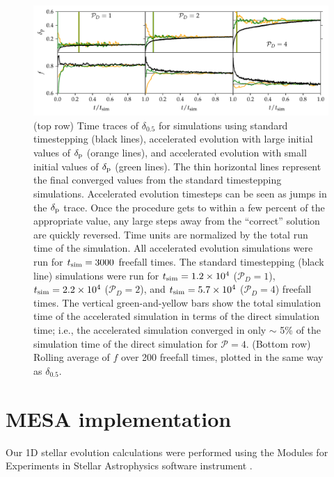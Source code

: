 \documentclass[twocolumn]{aastex631}
\newcommand{\delp}{\ensuremath{\delta_{\rm{p}}}}
\newcommand{\mP}{\ensuremath{\mathcal{P}}}
\begin{document}
\begin{figure}[t]
\centering
\includegraphics[width=\textwidth]{AE_time_figure.pdf}
\caption{
\label{fig:AE_time_figure}
(top row) Time traces of $\delta_{0.5}$ for simulations using standard timestepping (black lines), accelerated evolution with large initial values of $\delp$ (orange lines), and accelerated evolution with small initial values of $\delp$ (green lines).
The thin horizontal lines represent the final converged values from the standard timestepping simulations.
Accelerated evolution timesteps can be seen as jumps in the $\delp$ trace.
Once the procedure gets to within a few percent of the appropriate value, any large steps away from the ``correct'' solution are quickly reversed.
Time units are normalized by the total run time of the simulation.
All accelerated evolution simulations were run for $t_{\rm{sim}} = 3000$ freefall times.
The standard timestepping (black line) simulations were run for $t_{\rm{sim}} = 1.2 \times 10^4$ ($\mP_D = 1$), $t_{\rm{sim}} = 2.2 \times 10^4$ ($\mP_D = 2$), and $t_{\rm{sim}} = 5.7 \times 10^4$ ($\mP_D = 4$) freefall times.
The vertical green-and-yellow bars show the total simulation time of the accelerated simulation in terms of the direct simulation time; i.e., the accelerated simulation converged in only $\sim$ 5\% of the simulation time of the direct simulation for $\mP = 4$.
(Bottom row) Rolling average of $f$ over 200 freefall times, plotted in the same way as $\delta_{0.5}$.
}
\end{figure}





\section{MESA implementation}
\label{app:mesa}

Our 1D stellar evolution calculations were performed using the Modules for Experiments in Stellar Astrophysics software instrument \citep[MESA]{paxton_etal_2011, paxton_etal_2013, paxton_etal_2015, paxton_etal_2018, paxton_etal_2019}.
\end{document}
